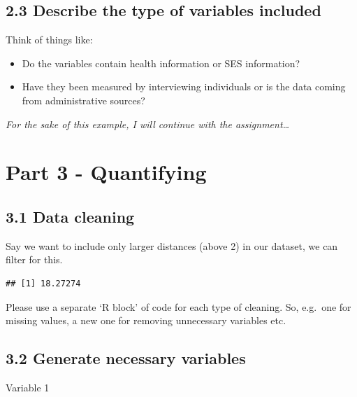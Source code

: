 \documentclass[
]{article}
\newenvironment{Shaded}{\begin{snugshade}}{\end{snugshade}}
\newcommand{\FunctionTok}[1]{\textcolor[rgb]{0.13,0.29,0.53}{\textbf{#1}}}
\newcommand{\NormalTok}[1]{#1}
\newcommand{\SpecialCharTok}[1]{\textcolor[rgb]{0.81,0.36,0.00}{\textbf{#1}}}
\begin{document}
\subsection{2.3 Describe the type of variables
included}\label{describe-the-type-of-variables-included}

Think of things like:

\begin{itemize}
\item
  Do the variables contain health information or SES information?
\item
  Have they been measured by interviewing individuals or is the data
  coming from administrative sources?
\end{itemize}

\emph{For the sake of this example, I will continue with the
assignment\ldots{}}

\section{Part 3 - Quantifying}\label{part-3---quantifying}

\subsection{3.1 Data cleaning}\label{data-cleaning}

Say we want to include only larger distances (above 2) in our dataset,
we can filter for this.

\begin{Shaded}
\end{Shaded}

\begin{verbatim}
## [1] 18.27274
\end{verbatim}

Please use a separate `R block' of code for each type of cleaning. So,
e.g.~one for missing values, a new one for removing unnecessary
variables etc.

\subsection{3.2 Generate necessary
variables}\label{generate-necessary-variables}

Variable 1
\end{document}
